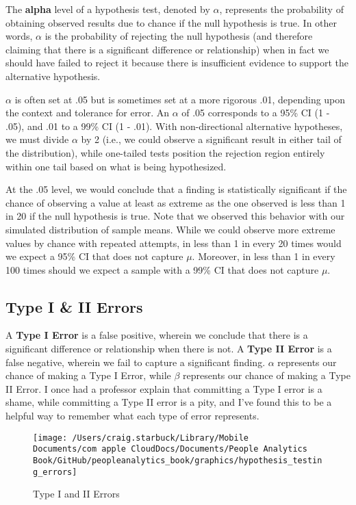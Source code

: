 \documentclass[
]{book}
\begin{document}
The \textbf{alpha} level of a hypothesis test, denoted by \(\alpha\), represents the probability of obtaining observed results due to chance if the null hypothesis is true. In other words, \(\alpha\) is the probability of rejecting the null hypothesis (and therefore claiming that there is a significant difference or relationship) when in fact we should have failed to reject it because there is insufficient evidence to support the alternative hypothesis.

\(\alpha\) is often set at .05 but is sometimes set at a more rigorous .01, depending upon the context and tolerance for error. An \(\alpha\) of .05 corresponds to a 95\% CI (1 - .05), and .01 to a 99\% CI (1 - .01). With non-directional alternative hypotheses, we must divide \(\alpha\) by 2 (i.e., we could observe a significant result in either tail of the distribution), while one-tailed tests position the rejection region entirely within one tail based on what is being hypothesized.

At the .05 level, we would conclude that a finding is statistically significant if the chance of observing a value at least as extreme as the one observed is less than 1 in 20 if the null hypothesis is true. Note that we observed this behavior with our simulated distribution of sample means. While we could observe more extreme values by chance with repeated attempts, in less than 1 in every 20 times would we expect a 95\% CI that does not capture \(\mu\). Moreover, in less than 1 in every 100 times should we expect a sample with a 99\% CI that does not capture \(\mu\).

\hypertarget{type-i-ii-errors}{%
\subsection{Type I \& II Errors}\label{type-i-ii-errors}}

A \textbf{Type I Error} is a false positive, wherein we conclude that there is a significant difference or relationship when there is not. A \textbf{Type II Error} is a false negative, wherein we fail to capture a significant finding. \(\alpha\) represents our chance of making a Type I Error, while \(\beta\) represents our chance of making a Type II Error. I once had a professor explain that committing a Type I error is a shame, while committing a Type II error is a pity, and I've found this to be a helpful way to remember what each type of error represents.

\begin{figure}

{\centering \texttt{[image: /Users/craig.starbuck/Library/Mobile Documents/com~apple~CloudDocs/Documents/People Analytics Book/GitHub/peopleanalytics\_book/graphics/hypothesis\_testing\_errors]} 

}

\caption{Type I and II Errors}\label{fig:hyp-errs}
\end{figure}
\end{document}
